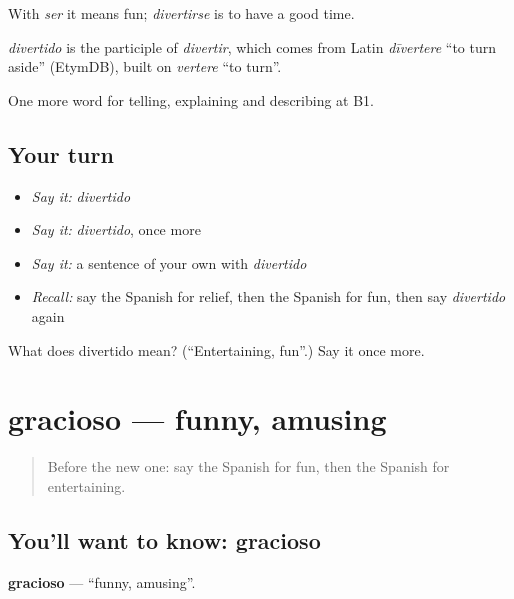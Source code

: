 With \emph{ser} it means fun; \emph{divertirse} is to have a good time.

\begin{cousinweb}
\emph{divertido} is the participle of \emph{divertir}, which comes from Latin \emph{dīvertere} \textquotedblleft{}to turn aside\textquotedblright{} (EtymDB), built on \emph{vertere} \textquotedblleft{}to turn\textquotedblright{}.
\end{cousinweb}

\begin{grammarlens}[title={What you've built}]
One more word for telling, explaining and describing at B1.
\end{grammarlens}

\subsection*{Your turn}
\begin{itemize}
\raggedright
  \item \emph{Say it:} \emph{divertido}
  \item \emph{Say it:} \emph{divertido}, once more
  \item \emph{Say it:} a sentence of your own with \emph{divertido}
  \item \emph{Recall:} say the Spanish for relief, then the Spanish for fun, then say \emph{divertido} again
\end{itemize}

\begin{tcolorbox}[breakable,colback=teal!4,colframe=teal!35!black,title={Before you move on}]
What does divertido mean? (\textquotedblleft{}Entertaining, fun\textquotedblright{}.) Say it once more.
\end{tcolorbox}
\section[gracioso]{gracioso — funny, amusing}

\label{lesson:ES-C713-gracioso}



\begin{quote}
Before the new one: say the Spanish for fun, then the Spanish for entertaining.
\end{quote}

\subsection*{You'll want to know: gracioso}
\textbf{gracioso} — \textquotedblleft{}funny, amusing\textquotedblright{}.

